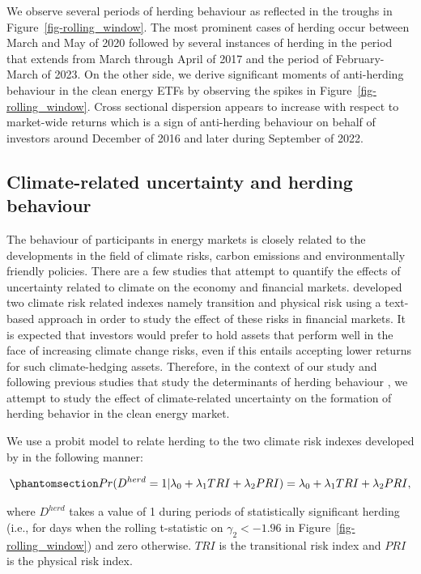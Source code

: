 \documentclass[
  letterpaper,
  DIV=11,
  numbers=noendperiod]{scrartcl}
\begin{document}
We observe several periods of herding behaviour as reflected in the
troughs in Figure~\ref{fig-rolling_window}. The most prominent cases of
herding occur between March and May of 2020 followed by several
instances of herding in the period that extends from March through April
of 2017 and the period of February-March of 2023. On the other side, we
derive significant moments of anti-herding behaviour in the clean energy
ETFs by observing the spikes in Figure~\ref{fig-rolling_window}. Cross
sectional dispersion appears to increase with respect to market-wide
returns which is a sign of anti-herding behaviour on behalf of investors
around December of 2016 and later during September of 2022.

\subsection{Climate-related uncertainty and herding
behaviour}\label{climate-related-uncertainty-and-herding-behaviour}

The behaviour of participants in energy markets is closely related to
the developments in the field of climate risks, carbon emissions and
environmentally friendly policies. There are a few studies that attempt
to quantify the effects of uncertainty related to climate on the economy
and financial markets. \citet{bua2024} developed two climate risk
related indexes namely transition and physical risk using a text-based
approach in order to study the effect of these risks in financial
markets. It is expected that investors would prefer to hold assets that
perform well in the face of increasing climate change risks, even if
this entails accepting lower returns for such climate-hedging assets.
Therefore, in the context of our study and following previous studies
that study the determinants of herding behaviour
\citep[see][]{bouri2019, demirer2018}, we attempt to study the effect of
climate-related uncertainty on the formation of herding behavior in the
clean energy market.

We use a probit model to relate herding to the two climate risk indexes
developed by \citet{bua2024} in the following manner:

\begin{equation}\phantomsection\label{eq-climate}{
Pr(D^{herd} = 1 |\lambda_0 +  \lambda_1TRI  + \lambda_2PRI) = \lambda_0 +  \lambda_1TRI  + \lambda_2PRI,
}\end{equation}

where \(D^{herd}\) takes a value of 1 during periods of statistically
significant herding (i.e., for days when the rolling t-statistic on
\(\gamma_2 < −1.96\) in Figure~\ref{fig-rolling_window}) and zero
otherwise. \(TRI\) is the transitional risk index and \(PRI\) is the
physical risk index.
\end{document}
